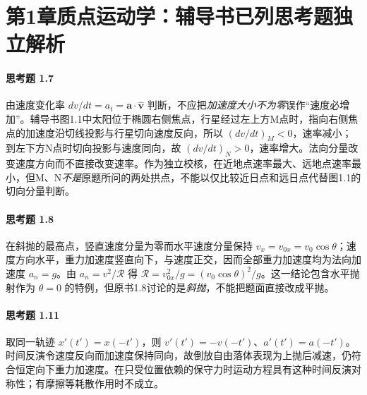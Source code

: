 \section*{第1章\quad 质点运动学：辅导书已列思考题独立解析}
\paragraph{思考题 1.7}
由速度变化率 \(dv/dt=a_t=\boldsymbol a\cdot\hat{\boldsymbol v}\) 判断，不应把\emph{加速度大小不为零}误作“速度必增加”。辅导书图1.1中太阳位于椭圆右侧焦点，行星经过左上方M点时，指向右侧焦点的加速度沿切线投影与行星切向速度反向，所以 \(\boxed{(dv/dt)_M<0}\)，速率减小；到左下方N点时切向投影与速度同向，故 \(\boxed{(dv/dt)_N>0}\)，速率增大。法向分量改变速度方向而不直接改变速率。作为独立校核，在近地点速率最大、远地点速率最小，但M、N\emph{不是}原题所问的两处拱点，不能以仅比较近日点和远日点代替图1.1的切向分量判断。

\paragraph{思考题 1.8}
在斜抛的最高点，竖直速度分量为零而水平速度分量保持 \(v_x=v_{0x}=v_0\cos\theta\)；速度方向水平，重力加速度竖直向下，与速度正交，因而全部重力加速度均为法向加速度 \(a_n=g\)。由 \(a_n=v^2/\mathcal R\) 得 \(\boxed{\mathcal R=v_{0x}^2/g=(v_0\cos\theta)^2/g}\)。这一结论包含水平抛射作为 \(\theta=0\) 的特例，但原书1.8讨论的是\emph{斜抛}，不能把题面直接改成平抛。

\paragraph{思考题 1.11}
取同一轨迹 \(x'(t')=x(-t')\)，则 \(\boxed{v'(t')=-v(-t')}\)、\(\boxed{a'(t')=a(-t')}\)。时间反演令速度反向而加速度保持同向，故倒放自由落体表现为上抛后减速，仍符合恒定向下重力加速度。在只受位置依赖的保守力时运动方程具有这种时间反演对称性；有摩擦等耗散作用时不成立。
